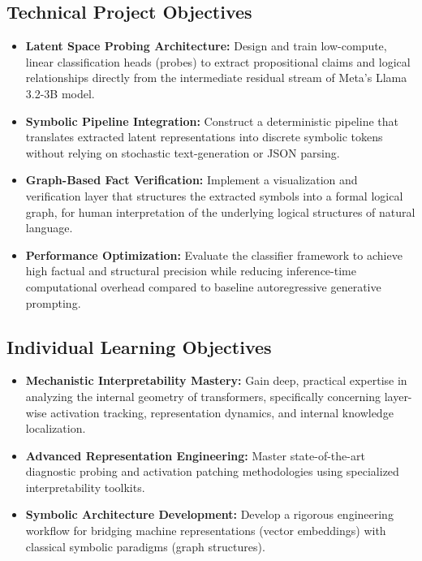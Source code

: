 \documentclass[12 pt]{article}  %
\begin{document}
\subsection{Technical Project Objectives}
\begin{itemize}
    \item \textbf{Latent Space Probing Architecture:} Design and train low-compute, linear classification heads (probes) to extract propositional claims and logical relationships directly from the intermediate residual stream of Meta's Llama 3.2-3B model.
    \item \textbf{Symbolic Pipeline Integration:} Construct a deterministic pipeline that translates extracted latent representations into discrete symbolic tokens without relying on stochastic text-generation or JSON parsing.
    \item \textbf{Graph-Based Fact Verification:} Implement a visualization and verification layer that structures the extracted symbols into a formal logical graph, for human interpretation of the underlying logical structures of natural language.
    \item \textbf{Performance Optimization:} Evaluate the classifier framework to achieve high factual and structural precision while reducing inference-time computational overhead compared to baseline autoregressive generative prompting.
\end{itemize}

\subsection{Individual Learning Objectives}
\begin{itemize}
    \item \textbf{Mechanistic Interpretability Mastery:} Gain deep, practical expertise in analyzing the internal geometry of transformers, specifically concerning layer-wise activation tracking, representation dynamics, and internal knowledge localization.
    \item \textbf{Advanced Representation Engineering:} Master state-of-the-art diagnostic probing and activation patching methodologies using specialized interpretability toolkits.
    \item \textbf{Symbolic Architecture Development:} Develop a rigorous engineering workflow for bridging machine representations (vector embeddings) with classical symbolic paradigms (graph structures).
\end{itemize}
\end{document}
